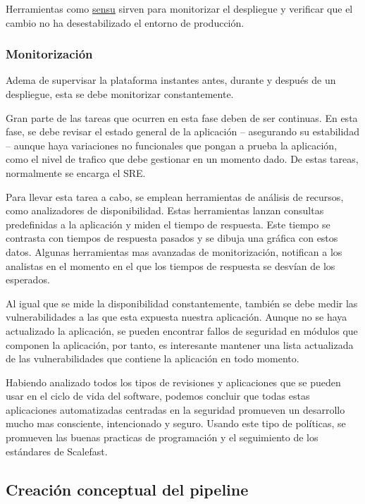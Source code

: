 \documentclass[12pt]{report} %
\begin{document}
Herramientas como \href{https://sensu.io/}{sensu} sirven para monitorizar el
despliegue y verificar que el cambio no ha desestabilizado el entorno de
producción.

\subsubsection{Monitorización} \label{monitorizacion}

Adema de supervisar la plataforma instantes antes, durante y después de un
despliegue, esta se debe monitorizar constantemente.

Gran parte de las tareas que ocurren en esta fase deben de ser continuas.
En esta fase, se debe revisar el estado general de la aplicación -- asegurando
su estabilidad -- aunque haya variaciones no funcionales que pongan a prueba la
aplicación, como el nivel de trafico que debe gestionar en un momento dado.
De estas tareas, normalmente se encarga el \acrfull{SRE}.

Para llevar esta tarea a cabo, se emplean herramientas de análisis de recursos,
como analizadores de disponibilidad.
Estas herramientas lanzan consultas predefinidas a la aplicación y miden el
tiempo de respuesta.
Este tiempo se contrasta con tiempos de respuesta pasados y se dibuja una
gráfica con estos datos.
Algunas herramientas mas avanzadas de monitorización, notifican a los analistas
en el momento en el que los tiempos de respuesta se desvían de los esperados.

Al igual que se mide la disponibilidad constantemente, también se debe medir las
vulnerabilidades a las que esta expuesta nuestra aplicación.
Aunque no se haya actualizado la aplicación, se pueden encontrar fallos de
seguridad en módulos que componen la aplicación, por tanto, es interesante
mantener una lista actualizada de las vulnerabilidades que contiene la
aplicación en todo momento.

Habiendo analizado todos los tipos de revisiones y aplicaciones que se pueden
usar en el ciclo de vida del software, podemos concluir que todas estas
aplicaciones automatizadas centradas en la seguridad promueven un desarrollo
mucho mas consciente, intencionado y seguro.  Usando este tipo de políticas, se
promueven las buenas practicas de programación y el seguimiento de los
estándares de Scalefast.

\subsection{Creación conceptual del pipeline}
\label{creacionconceptualdelpipeline}
\end{document}
